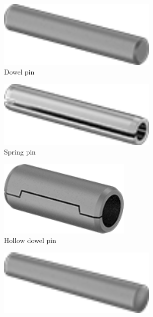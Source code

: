 	\begin{figure}[H]
		\centering
		\begin{subfigure}[b]{.19\linewidth}
			\includegraphics[width=0.85\textwidth]{imgs/dpin.png}
			\caption{Dowel pin}
		\end{subfigure}\begin{subfigure}[b]{.19\linewidth}
			\includegraphics[width=0.85\textwidth]{imgs/spin.png}
			\caption{Spring pin}
		\end{subfigure}\begin{subfigure}[b]{.19\linewidth}
			\includegraphics[width=0.7\textwidth]{imgs/hollow_dpin.png}
			\caption{Hollow dowel pin}
		\end{subfigure}\begin{subfigure}[b]{.19\linewidth}
			\includegraphics[width=0.85\textwidth]{imgs/tpin.png}

\end{subfigure}
\end{figure}
